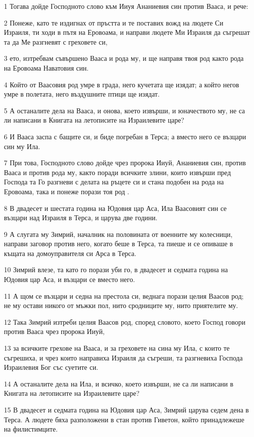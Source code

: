 \par 1 Тогава дойде Господното слово към Ииуя Ананиевия син против Вааса, и рече:
\par 2 Понеже, като те издигнах от пръстта и те поставих вожд на людете Си Израиля, ти ходи в пътя на Еровоама, и направи людете Ми Израиля да съгрешат та да Ме разгневят с греховете си,
\par 3 ето, изтребвам съвършено Вааса и рода му, и ще направя твоя род както рода на Еровоама Наватовия син.
\par 4 Който от Ваасовия род умре в града, него кучетата ще изядат; а който негов умре в полетата, него въздушните птици ще изядат.
\par 5 А останалите дела на Вааса, и онова, което извърши, и юначеството му, не са ли написани в Книгата на летописите на Израилевите царе?
\par 6 И Вааса заспа с бащите си, и биде погребан в Терса; а вместо него се възцари син му Ила.
\par 7 При това, Господното слово дойде чрез пророка Ииуй, Ананиевия син, против Вааса и против рода му, както поради всичките злини, които извърши пред Господа та Го разгневи с делата на ръцете си и стана подобен на рода на Еровоама, така и понеже порази тоя род .
\par 8 В двадесет и шестата година на Юдовия цар Аса, Ила Ваасовият син се възцари над Израиля в Терса, и царува две години.
\par 9 А слугата му Зимрий, началник на половината от военните му колесници, направи заговор против него, когато беше в Терса, та пиеше и се опиваше в къщата на домоуправителя си Арса в Терса.
\par 10 Зимрий влезе, та като го порази уби го, в двадесет и седмата година на Юдовия цар Аса, и възцари се вместо него.
\par 11 А щом се възцари и седна на престола си, веднага порази целия Ваасов род; не му остави никого от мъжки пол, нито сродниците му, нито приятелите му.
\par 12 Така Зимрий изтреби целия Ваасов род, според словото, което Господ говори против Вааса чрез пророка Ииуй,
\par 13 за всичките грехове на Вааса, и за греховете на сина му Ила, с които те съгрешиха, и чрез които направиха Израиля да съгреши, та разгневиха Господа Израилевия Бог със суетите си.
\par 14 А останалите дела на Ила, и всичко, което извърши, не са ли написани в Книгата на летописите на Израилевите царе?
\par 15 В двадесет и седмата година на Юдовия цар Аса, Зимрий царува седем дена в Терса. А людете бяха разположени в стан против Гиветон, който принадлежеше на филистимците.
